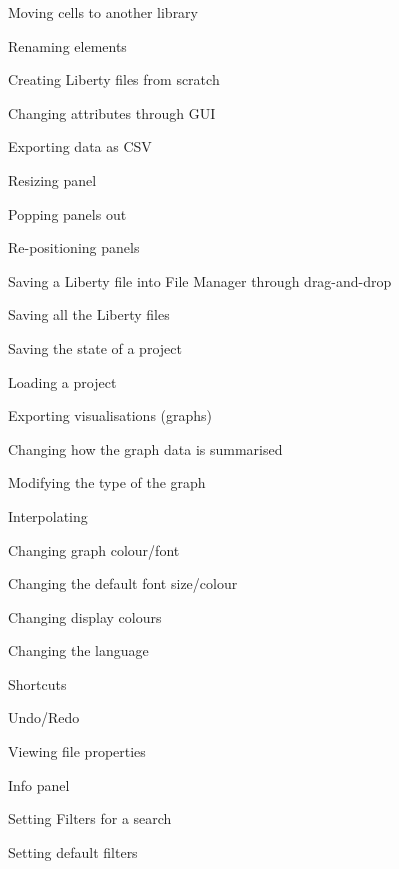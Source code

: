 \documentclass[10pt,a4paper]{report}
\begin{document}
\begin{FRO}
    \item Moving cells to another library \label{FRO-1}
    \item Renaming elements \label{FRO-2}
    \item Creating Liberty files from scratch \label{FRO-3}
    \item Changing attributes through GUI \label{FRO-4}
    \item Exporting data as CSV \label{FRO-5}
    \item Resizing panel \label{FRO-xy}
    \item Popping panels out \label{FRO-xyz}
    \item Re-positioning panels \label{FRO-xyzt}
    \item Saving a Liberty file into File Manager through drag-and-drop \label{FRO-6}
    \item Saving all the Liberty files \label{FRO-7.5} %
    \item Saving the state of a project \label{FRO-7}
    \item Loading a project \label{FRO-8}
    \item Exporting visualisations (graphs) \label{FRO-9}
    \item Changing how the graph data is summarised \label{FRO-10}
    \item Modifying the type of the graph \label{FRO-11}
    \item Interpolating \label{FR-(x1-x)/(y1-y)}
    \item Changing graph colour/font \label{FRO-14}
    \item Changing the default font size/colour \label{FRO-15}
    \item Changing display colours \label{FRO-16}
    \item Changing the language \label{FRO-17}
    \item Shortcuts \label{FRO-18}
    \item Undo/Redo \label{FRO-19}
    \item Viewing file properties \label{FRO-20}
    \item Info panel \label{20.5} %
    \item Setting Filters for a search \label{FRO-22}
    \item Setting default filters\label{FRO-23}
\end{FRO}
\end{document}

